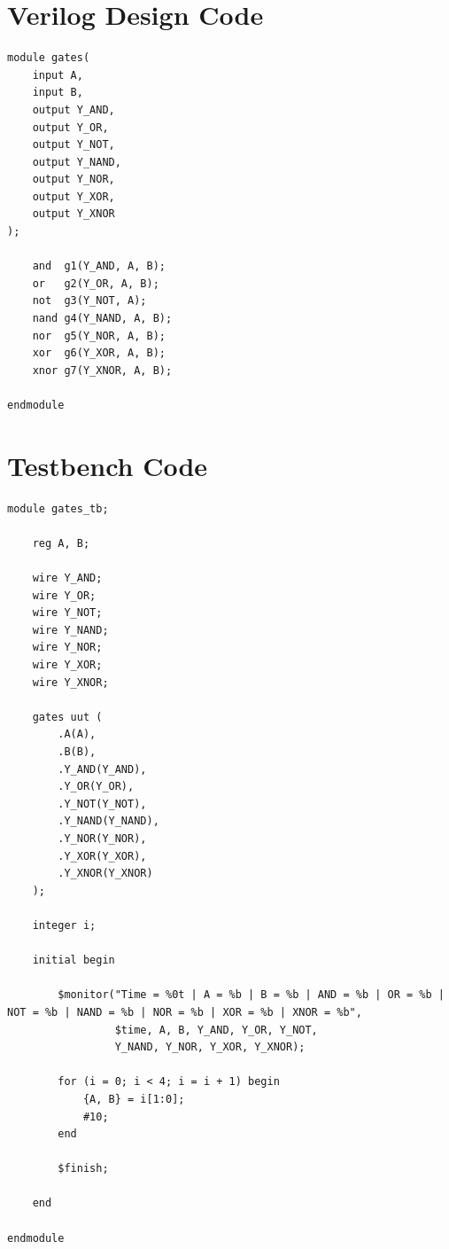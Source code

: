 \documentclass[12pt,a4paper]{report}
\begin{document}
\section{Verilog Design Code}

\begin{verilogbox}
\begin{lstlisting}
module gates(
    input A,
    input B,
    output Y_AND,
    output Y_OR,
    output Y_NOT,
    output Y_NAND,
    output Y_NOR,
    output Y_XOR,
    output Y_XNOR
);

    and  g1(Y_AND, A, B);
    or   g2(Y_OR, A, B);
    not  g3(Y_NOT, A);
    nand g4(Y_NAND, A, B);
    nor  g5(Y_NOR, A, B);
    xor  g6(Y_XOR, A, B);
    xnor g7(Y_XNOR, A, B);

endmodule
\end{lstlisting}
\end{verilogbox}

\section{Testbench Code}

\begin{verilogbox}
\begin{lstlisting}
module gates_tb;

    reg A, B;

    wire Y_AND;
    wire Y_OR;
    wire Y_NOT;
    wire Y_NAND;
    wire Y_NOR;
    wire Y_XOR;
    wire Y_XNOR;

    gates uut (
        .A(A),
        .B(B),
        .Y_AND(Y_AND),
        .Y_OR(Y_OR),
        .Y_NOT(Y_NOT),
        .Y_NAND(Y_NAND),
        .Y_NOR(Y_NOR),
        .Y_XOR(Y_XOR),
        .Y_XNOR(Y_XNOR)
    );

    integer i;

    initial begin

        $monitor("Time = %0t | A = %b | B = %b | AND = %b | OR = %b | NOT = %b | NAND = %b | NOR = %b | XOR = %b | XNOR = %b",
                 $time, A, B, Y_AND, Y_OR, Y_NOT,
                 Y_NAND, Y_NOR, Y_XOR, Y_XNOR);

        for (i = 0; i < 4; i = i + 1) begin
            {A, B} = i[1:0];
            #10;
        end

        $finish;

    end

endmodule
\end{lstlisting}
\end{verilogbox}
\end{document}
